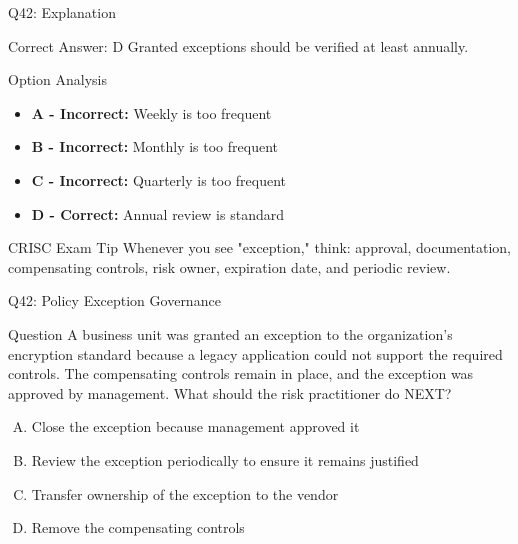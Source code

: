 \documentclass{beamer}
\begin{document}
	\begin{frame}{Q42: Explanation}
		\begin{block}{Correct Answer: D}
			Granted exceptions should be verified at least annually.
		\end{block}
		\begin{block}{Option Analysis}
			\begin{itemize}
				\item \textbf{A - Incorrect:} Weekly is too frequent
				\item \textbf{B - Incorrect:} Monthly is too frequent
				\item \textbf{C - Incorrect:} Quarterly is too frequent
				\item \textbf{D - Correct:} Annual review is standard
			\end{itemize}
		\end{block}
		
		
		\begin{block}{CRISC Exam Tip} Whenever you see "exception," think: approval, documentation, compensating controls, risk owner, expiration date, and periodic review. \end{block}
		
	\end{frame}
	
	
	\begin{frame}{Q42: Policy Exception Governance} \begin{block}{Question} A business unit was granted an exception to the organization's encryption standard because a legacy application could not support the required controls. The compensating controls remain in place, and the exception was approved by management. What should the risk practitioner do NEXT? \end{block} \begin{enumerate}[(A)] \item Close the exception because management approved it \item Review the exception periodically to ensure it remains justified \item Transfer ownership of the exception to the vendor \item Remove the compensating controls \end{enumerate} \end{frame} 
	
\end{document}
